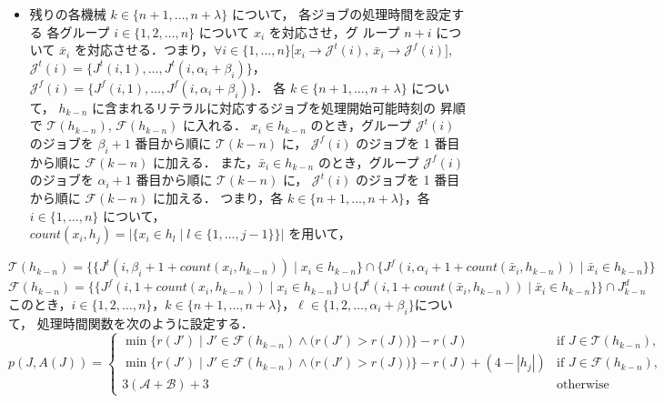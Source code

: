 \documentclass[12pt]{optlab-bachelor}
\begin{document}
  \begin{itemize}
    \item 残りの各機械 $k \in \{n + 1, \ldots , n + \lambda\}$ について，
    各ジョブの処理時間を設定する
    各グループ $i \in \{1,2,\ldots,n\}$ について $x_i$ を対応させ，グ
    ループ $n + i$ について $\bar x_i$ を対応させる．つまり，$\forall
    i \in \{1,\ldots,n\}\big[x_i \to \mathcal{J}^t(i),\ \bar x_i \to
    \mathcal{J}^f(i) \big]$,
    $\mathcal{J}^t(i) = \big\{J^t(i,1),\ldots,J^t(i,\alpha_i +
    \beta_i)\big\}$，$\mathcal{J}^f(i) =
    \big\{J^f(i,1),\ldots,J^f(i,\alpha_i + \beta_i)\big\}$．
    各 $k \in \{n + 1, \ldots , n + \lambda\}$ について，
    $h_{k - n}$ に含まれるリテラルに対応するジョブを処理開始可能時刻の
    昇順で $\mathcal{T}(h_{k - n})$, $\mathcal{F}(h_{k - n})$ に入れる．
    $x_i \in h_{k - n}$ のとき，グループ $\mathcal{J}^t(i)$ のジョブを
    $\beta_i + 1$ 番目から順に $\mathcal{T}(k - n)$ に，
    $\mathcal{J}^f(i)$ のジョブを 1 番目から順に $\mathcal{F}(k - n)$ に加える．
    また，$\bar x_i \in h_{k - n}$ のとき，グループ $\mathcal{J}^f(i)$
    のジョブを $\alpha_i + 1$ 番目から順に $\mathcal{T}(k - n)$ に，
    $\mathcal{J}^t(i)$ のジョブを 1 番目から順に $\mathcal{F}(k - n)$ に加える．
    つまり，各 $k \in \{n + 1, \ldots,n + \lambda\}$，各 $i \in \{1,\ldots,n\}$
    について，\\
    $count(x_i,h_j) = \big|\big\{x_i \in h_l \mid l \in \{1,\ldots,j -
    1\}\big\}\big|$ を用いて，
  \end{itemize}
  {\footnotesize
  $\mathcal{T}(h_{k - n}) = \bigg\{\big\{J^t(i,\beta_i + 1 +
  count(x_i,h_{k - n})) \mid x_i \in h_{k - n}\big\} \cap
  \big\{J^f(i,\alpha_i + 1 + count(\bar x_i, h_{k - n})) \mid \bar
  x_i \in h_{k - n}\big\}\bigg\}$\\
  }
  {\footnotesize
  $\mathcal{F}(h_{k - n}) = \bigg\{\big\{J^f(i,1 + count(
  x_i,h_{k - n})) \mid x_i \in h_{k - n} \big\} \cup \big\{J^t(i,1
  + count(\bar x_i,h_{k - n})) \mid \bar x_i \in h_{k - n}\big\} \bigg\}
  \cap J^d_{k - n}$\\
  }
  このとき，$i \in \{1,2,\ldots,n\}$，$k \in \{n + 1, \ldots , n +
  \lambda\}$，$\ell \in \{1,2,\ldots, \alpha_i + \beta_i\}$について，
  処理時間関数を次のように設定する．
  {\small
  $$p(J,A(J)) = \left\{ \begin{array}{lll} \min \big\{r(J') \mid
  J' \in \mathcal{F}(h_{k - n}) \wedge \big(r(J') > r(J) \big) \big\} - r(J)
  & \text{if } J \in \mathcal{T}(h_{k - n}), \\ \min \big\{r(J') \mid
  J' \in \mathcal{F}(h_{k - n}) \wedge \big(r(J') > r(J) \big) \big\} - r(J)
  + (4 - |h_j|) & \text{if } J \in \mathcal{F}(h_{k - n}), \\ 3(\mathcal{A} +
  \mathcal{B}) + 3 & \text{otherwise}\end{array} \right.$$
  }
\end{document}
